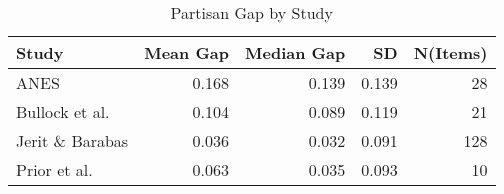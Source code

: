 \begin{table}[!htb]
\centering
\begin{tabular}{lrrrr}
  \hline
Study & Mean Gap & Median Gap & SD & N(Items) \\ 
  \hline
ANES & 0.168 & 0.139 & 0.139 &   28 \\ 
  Bullock et al. & 0.104 & 0.089 & 0.119 &   21 \\ 
  Jerit \& Barabas & 0.036 & 0.032 & 0.091 &  128 \\ 
  Prior et al. & 0.063 & 0.035 & 0.093 &   10 \\ 
   \hline
\end{tabular}
\caption{Partisan Gap by Study} 
\label{tab:tab_1}
\end{table}
